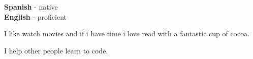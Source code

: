 \documentclass[8pt]{developercv} %
\begin{document}
\begin{minipage}[t]{0.3\textwidth}
	\vspace{-\baselineskip} %

	
	\textbf{Spanish} - native\\
	\textbf{English} - proficient\\
\end{minipage}
\hfill
\begin{minipage}[t]{0.3\textwidth}
	\vspace{-\baselineskip} %
	
	
	I like watch movies and if i have time i love read with a fantastic cup of cocoa.
\end{minipage}
\hfill
\begin{minipage}[t]{0.3\textwidth}
	\vspace{-\baselineskip} %
	
	
	I help other people learn to code.
\end{minipage}

\end{document}
